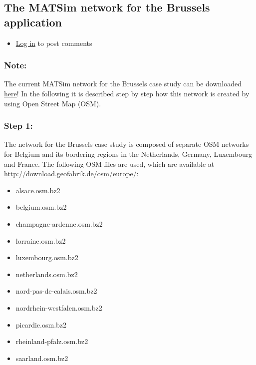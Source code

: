 \documentclass[a4paper,11pt]{report}
\begin{document}
\subsection{The MATSim network for the Brussels application}
\begin{itemize}
	\item \href{http://www.matsim.org/user/login?destination=comment/reply/724%23comment-form}{Log in} to post comments
\end{itemize}

\subsubsection{Note:}

The current MATSim network for the Brussels case study can be downloaded \href{https://svn.vsp.tu-berlin.de/repos/public-svn/matsim/examples/countries/be/brussels/network/belgium_incl_borderArea_hierarchylayer4_clean_simple.xml.gz}{here}! In the following it is described step by step how this network is created by using Open Street Map (OSM).

\subsubsection{Step 1:}

The network for the Brussels case study is composed of separate OSM  networks for Belgium and its bordering regions in the Netherlands,  Germany, Luxembourg and France. The following OSM files are used, which  are available at \href{http://download.geofabrik.de/osm/europe/}{http://download.geofabrik.de/osm/europe/}:
\begin{itemize}
	\item  alsace.osm.bz2
	\item  belgium.osm.bz2
	\item  champagne-ardenne.osm.bz2
	\item  lorraine.osm.bz2
	\item  luxembourg.osm.bz2
	\item  netherlands.osm.bz2
	\item  nord-pas-de-calais.osm.bz2
	\item  nordrhein-westfalen.osm.bz2
	\item  picardie.osm.bz2
	\item  rheinland-pfalz.osm.bz2
	\item  saarland.osm.bz2
\end{itemize}
\end{document}
